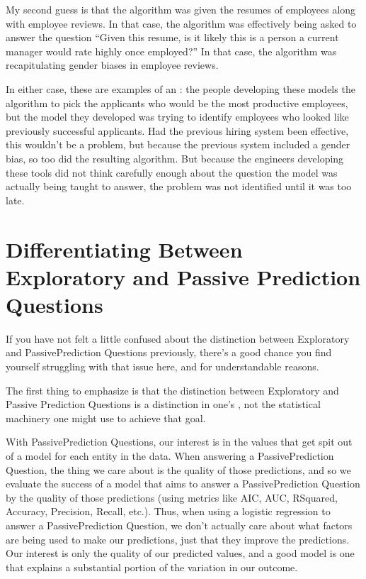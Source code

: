 \documentclass[letterpaper,10pt,english]{jupyterBook}
\begin{document}
\sphinxAtStartPar
My second guess is that the algorithm was given the resumes of  employees along with employee reviews. In that case, the algorithm was effectively being asked to answer the question “Given this resume, is it likely this is a person a current manager would rate highly once employed?” In that case, the algorithm was recapitulating gender biases in employee reviews.

\sphinxAtStartPar
In either case, these are examples of an : the people developing these models  the algorithm to pick the applicants who would be the most productive employees, but the model they  developed was trying to identify employees who looked like previously successful applicants. Had the previous hiring system been effective, this wouldn’t be a problem, but because the previous system included a gender bias, so too did the resulting algorithm. But because the engineers developing these tools did not think carefully enough about the question the model was actually being taught to answer, the problem was not identified until it was too late.


\section{Differentiating Between Exploratory and Passive Prediction Questions}
\label{\detokenize{30_questions/20_using_passive_prediction_questions:differentiating-between-exploratory-and-passive-prediction-questions}}
\sphinxAtStartPar
If you have not felt a little confused about the distinction between Exploratory and Passive\sphinxhyphen{}Prediction Questions previously, there’s a good chance you find yourself struggling with that issue here, and for understandable reasons.

\sphinxAtStartPar
The first thing to emphasize is that the distinction between Exploratory and Passive Prediction Questions is a distinction in one’s , not the statistical machinery one might use to achieve that goal.

\sphinxAtStartPar
With Passive\sphinxhyphen{}Prediction Questions, our interest is in the values that get spit out of a model for each entity in the data. When answering a Passive\sphinxhyphen{}Prediction Question, the  thing we care about is the quality of those predictions, and so we evaluate the success of a model that aims to answer a Passive\sphinxhyphen{}Prediction Question by the quality of those predictions (using metrics like AIC, AUC, R\sphinxhyphen{}Squared, Accuracy, Precision, Recall, etc.). Thus, when using a logistic regression to answer a Passive\sphinxhyphen{}Prediction Question, we don’t actually care about what factors are being used to make our predictions, just that they improve the predictions. Our interest is only the quality of our predicted values, and a good model is one that explains a substantial portion of the variation in our outcome.
\end{document}
